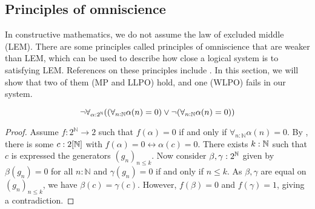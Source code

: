 \subsection{Principles of omniscience}
In constructive mathematics, we do not assume the law of excluded middle (LEM).
There are some principles called principles of omniscience that are weaker than LEM, which can be used to describe 
how close a logical system is to satisfying LEM.
References on these principles include \cite{HannesDiener, ReverseMathsBishop}.
In this section, we will show that two of them (MP and LLPO) hold, 
and one (WLPO) fails in our system.

\begin{theorem}\label{NotWLPO}
  \begin{equation}
    \neg \forall_{\alpha:2^{\mathbb{N}}} 
    ((\forall_{n:\mathbb{N}} \alpha(n) = 0 ) \vee \neg (\forall_{n:\mathbb{N}} \alpha(n) = 0))
  \end{equation}
\end{theorem}
\begin{proof}
  Assume $f:2^\mathbb N \to 2$ such that 
  $f(\alpha) = 0$ if and only if $\forall_{n:\mathbb N} \alpha (n)= 0$. 
  By , there is some $c:2[\mathbb{N}]$ with 
  $f(\alpha) = 0 \leftrightarrow \alpha(c) = 0$. 
  There exists $k:\mathbb{N}$ such that $c$ is expressed the generators $(g_n)_{n\leq k}$. 
  Now consider $\beta,\gamma:2^{\mathbb{N}}$ given by 
  $\beta(g_n) = 0$ for all $n:\mathbb N$ and
  $\gamma(g_n) = 0$ if and only if $n\leq k$. 
  As $\beta, \gamma$ are equal on $(g_n)_{n\leq k}$, we have $\beta(c) = \gamma(c)$. 
  However, $f(\beta) = 0$ and $f(\gamma) = 1$, giving a contradiction. 
\end{proof}

